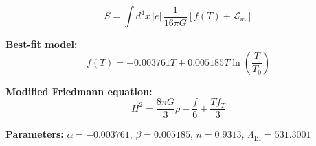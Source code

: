 
\begin{equation}
  S = \int d^4x \, |e| \, \frac{1}{16\pi G} \left[ f(T) + \mathcal{L}_m \right]
\end{equation}

\textbf{Best-fit model:}
\begin{equation}
  f(T) = -0.003761 T + 0.005185 T \ln\!\left(\frac{T}{T_0}\right)
\end{equation}

\textbf{Modified Friedmann equation:}
\begin{equation}
  H^2 = \frac{8\pi G}{3} \rho - \frac{f}{6} + \frac{T f_T}{3}
\end{equation}

\textbf{Parameters:}
$\alpha = -0.003761$, \quad
$\beta = 0.005185$, \quad
$n = 0.9313$, \quad
$\Lambda_{\text{BI}} = 531.3001$